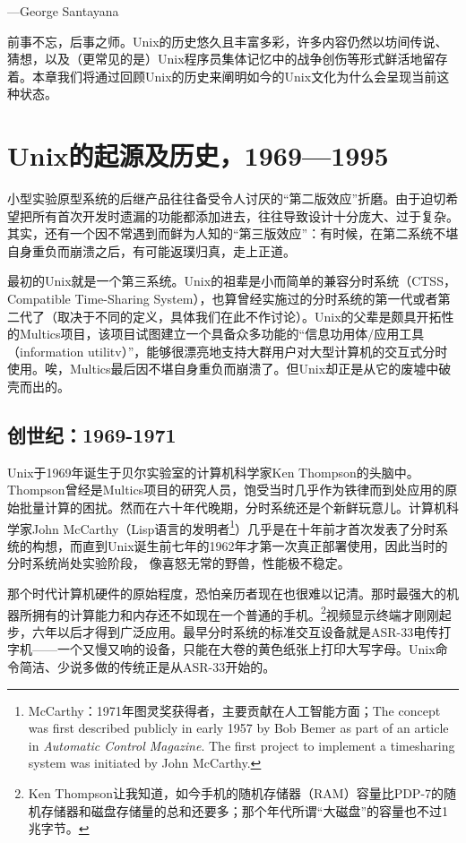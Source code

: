 \documentclass[12pt,oneside]{ctexbook}
\begin{document}
\begin{common-format}
\begin{flushright}
\begin{notecard}{17em}
{\hfill —George Santayana}
\end{notecard}
\end{flushright}

前事不忘，后事之师。Unix的历史悠久且丰富多彩，许多内容仍然以坊间传说、猜想，以及（更常见的是）Unix程序员集体记忆中的战争创伤等形式鲜活地留存着。本章我们将通过回顾Unix的历史来阐明如今的Unix文化为什么会呈现当前这种状态。

\section{Unix的起源及历史，1969—1995}
小型实验原型系统的后继产品往往备受令人讨厌的“第二版效应”折磨。由于迫切希望把所有首次开发时遗漏的功能都添加进去，往往导致设计十分庞大、过于复杂。其实，还有一个因不常遇到而鲜为人知的“第三版效应”：有时候，在第二系统不堪自身重负而崩溃之后，有可能返璞归真，走上正道。

最初的Unix就是一个第三系统。Unix的祖辈是小而简单的兼容分时系统（CTSS，Compatible Time-Sharing System），也算曾经实施过的分时系统的第一代或者第二代了（取决于不同的定义，具体我们在此不作讨论）。Unix的父辈是颇具开拓性的Multics项目，该项目试图建立一个具备众多功能的“信息功用体/应用工具（information utilitv）”，能够很漂亮地支持大群用户对大型计算机的交互式分时使用。唉，Multics最后因不堪自身重负而崩溃了。但Unix却正是从它的废墟中破壳而出的。

\subsection{创世纪：1969-1971}
Unix于1969年诞生于贝尔实验室的计算机科学家Ken Thompson的头脑中。Thompson曾经是Multics项目的研究人员，饱受当时几乎作为铁律而到处应用的原始批量计算的困扰。然而在六十年代晚期，分时系统还是个新鲜玩意儿。计算机科学家John McCarthy（Lisp语言的发明者\footnote{McCarthy：1971年图灵奖获得者，主要贡献在人工智能方面；The concept was first described publicly in early 1957 by Bob Bemer as part of an article in \textit{Automatic Control Magazine}.  The first project to implement a timesharing system was initiated by John McCarthy. }）几乎是在十年前才首次发表了分时系统的构想，而直到Unix诞生前七年的1962年才第一次真正部署使用，因此当时的分时系统尚处实验阶段，
像喜怒无常的野兽，性能极不稳定。

那个时代计算机硬件的原始程度，恐怕亲历者现在也很难以记清。那时最强大的机器所拥有的计算能力和内存还不如现在一个普通的手机。\footnote{Ken Thompson让我知道，如今手机的随机存储器（RAM）容量比PDP-7的随机存储器和磁盘存储量的总和还要多；那个年代所谓“大磁盘”的容量也不过1兆字节。}视频显示终端才刚刚起步，六年以后才得到广泛应用。最早分时系统的标准交互设备就是ASR-33电传打字机——一个又慢又响的设备，只能在大卷的黄色纸张上打印大写字母。Unix命令简洁、少说多做的传统正是从ASR-33开始的。


\end{common-format}
\end{document}
